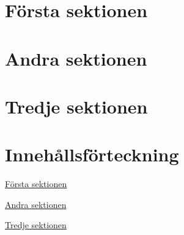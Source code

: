 \usepackage{hyperref}

\tableofcontents
\section{Första sektionen} \label{sec:1}
\section{Andra sektionen} \label{sec:2}
\section{Tredje sektionen} \label{sec:3}

\newpage %

\section*{Innehållsförteckning}
\hyperref[sec:1]{Första sektionen} \par
\hyperref[sec:2]{Andra sektionen} \par
\hyperref[sec:3]{Tredje sektionen} \par
